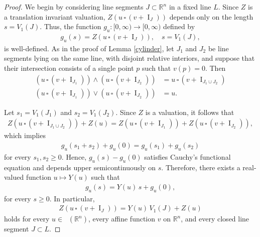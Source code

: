\documentclass[11pt]{article}
\theoremstyle{definition} %
\newcommand{\RR}{(\mathbb{R}^n)}
\DeclareMathOperator{\I}{I}
\DeclareMathOperator{\LP}{Conv_{lp}}
\begin{document}
\begin{proof}
We begin by considering line segments $J\subset \mathbb{R}^n$ in a fixed line $L$. 
Since $Z$ is a translation invariant valuation, $Z(u\,\square\, (v+\I_J))$ depends only on the length $s=V_1(J)$. Thus, the function $g_u: [0,\infty)\rightarrow [0, \infty)$
defined by
\begin{align*}
  g_u(s)= Z(u\,\square\, (v+\I_J)), \quad  s=V_1(J),
\end{align*}
is well-defined. As in the proof of Lemma \ref{cylinder}, let $J_1$ and $J_2$ be line segments lying on the same line, with disjoint relative interiors, and suppose that their intersection consists of a single point $p$ such that $v(p)=0$. Then
\begin{align*}
    (u\,\square\, (v+\I_{J_1}))\wedge (u\,\square\, (v+\I_{J_2})) & =u\,\square\, (v+\I_{J_1\cup J_2})\\
    (u\,\square\, (v+\I_{J_1}))\vee (u\,\square\, (v+\I_{J_2})) & =u.
\end{align*}


Let $s_1=V_1(J_1)$ and $s_2=V_1(J_2)$. Since $Z$ is  a valuation, it follows that
\begin{align*}
    Z(u\,\square\, (v+\I_{J_1\cup J_2}))+Z(u)= Z(u\,\square\, (v+\I_{J_1}))+Z(u\,\square\, (v+\I_{J_2})),
\end{align*}
which implies
\begin{align*}
    g_u(s_1+s_2)+g_u(0)=g_u(s_1)+g_u(s_2)
\end{align*}
for every $s_1,s_2\geq 0$. Hence, $g_u(s)-g_u(0)$ satisfies Cauchy’s functional equation and depends upper semicontinuously on $s$. Therefore, there exists a real-valued function $u \mapsto Y(u)$ such that
\begin{align*}
    g_u(s)=Y(u)\, s+g_u(0),
\end{align*}
for every $s\geq 0$. In particular,
\begin{align}\label{1.18}
Z(u\,\square\, (v+\I_J))  = Y(u)\,V_1(J)+Z(u)  
\end{align}
holds for every $u\in\LP\RR$, every  affine function $v$ on $\mathbb{R}^n$, and every closed line segment $J\subset L$.







\end{proof}
\end{document}
